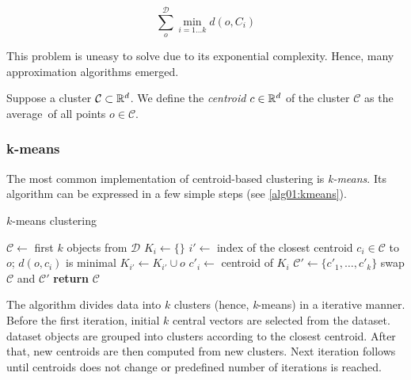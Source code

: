 \begin{equation}\label{eq01:sum}
	\sum_o^{\mathcal{D}} \min_{i=1\dots k}d(o,C_i)
\end{equation}

This problem is uneasy to solve due to its exponential complexity. Hence, many approximation algorithms emerged. 

\begin{defn}[Centroid]
	Suppose a cluster $\mathcal{C} \subset \mathbb{R}^d$. We define the \emph{centroid} $c \in \mathbb{R}^d$ of the cluster $\mathcal{C}$ as the average\ of all points $o \in \mathcal{C}$. 
	\label{def01:centr}
\end{defn}

\subsubsection{k-means}

The most common implementation of centroid-based clustering is \emph{k-means}. Its algorithm can be expressed in a few simple steps (see \ref{alg01:kmeans}).

\begin{algorithm}
	\caption{$k$-means clustering}
	\label{alg01:kmeans}
	\begin{algorithmic}[1]
		\State $\mathcal{C} \gets$ first $k$ objects from  $\mathcal{D}$ 
		\Repeat
				\State $K_i \gets \{\}$
			\EndFor
				\State $i' \gets$ index of the closest centroid $c_i \in \mathcal{C}$ to $o$; $d(o,c_i)$ is minimal
				\State $K_{i'} \gets K_{i'} \cup o$ 
			\EndFor
				\State $c'_i \gets$ centroid of $K_i$ 
			\EndFor
			\State $\mathcal{C}' \gets \{c'_1,\dots,c'_k\}$
			\State swap $\mathcal{C}$ and $\mathcal{C}'$
		\State \textbf{return} $\mathcal{C}$
		\EndProcedure
	\end{algorithmic}
\end{algorithm}


The algorithm divides data into $k$ clusters (hence, \emph{k}-means) in a iterative manner. Before the first iteration, initial $k$ central vectors are selected from the dataset.  dataset objects are grouped into clusters according to the closest centroid. After that, new centroids are then computed from new clusters. Next iteration follows until centroids does not change or predefined number of iterations is reached. 

